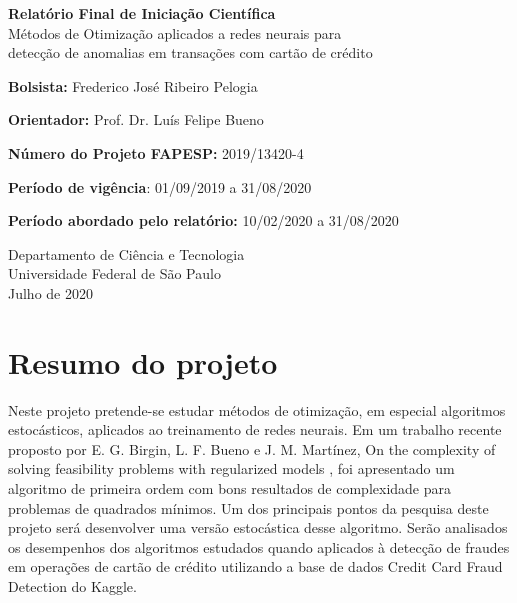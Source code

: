 \documentclass[11pt]{article}
\begin{document}
\begin{titlepage}
   \begin{center}
       \vspace*{1cm}
 
       \Large
       \textbf{Relatório Final de Iniciação Científica}\\
       Métodos de Otimização aplicados a redes neurais para \\ detecção de anomalias em transações com cartão de crédito
 	   
 	   \normalsize
       \vspace{5.5cm}
        \textbf{Bolsista:} Frederico José Ribeiro Pelogia
        
       \vspace{0.5cm}
        \textbf{Orientador:} Prof. Dr. Luís Felipe Bueno
 
       \vspace{0.5cm}
 
       \textbf{Número do Projeto FAPESP:} 2019/13420-4\\
       
      \vspace{0.5cm}
      
		\textbf{Período de vigência}: 01/09/2019 a 31/08/2020    
      
      \vspace{0.5cm}
		\textbf{Período abordado pelo relatório:} 10/02/2020 a 31/08/2020
 
       \vfill

 
 
       Departamento de Ciência e Tecnologia\\
       Universidade Federal de São Paulo\\
       Julho de 2020
 
   \end{center}
\end{titlepage}

\section*{Resumo do projeto}
 Neste projeto pretende-se estudar métodos de otimização, em especial algoritmos estocásticos,
aplicados ao treinamento de redes neurais. Em um trabalho\supercite{bmLS} recente proposto por E. G. Birgin, L. F. Bueno e
J. M. Martínez, On the complexity of solving feasibility problems with regularized models , foi apresentado um algoritmo
de primeira ordem com bons resultados de complexidade para problemas de quadrados mínimos.
Um dos principais pontos da pesquisa deste projeto será desenvolver uma versão estocástica desse
algoritmo. Serão analisados os desempenhos dos algoritmos estudados quando aplicados à detecção
de fraudes em operações de cartão de crédito utilizando a base de dados Credit Card Fraud Detection
do Kaggle.
\end{document}
